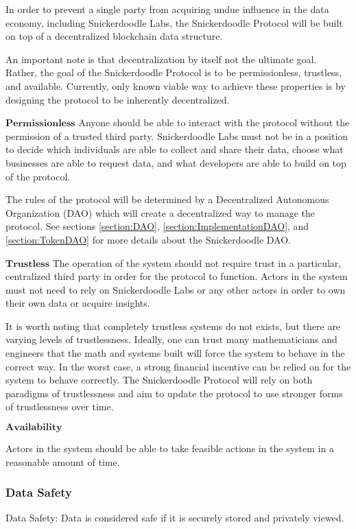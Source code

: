 In order to prevent a single party from acquiring undue influence in the data economy, including Snickerdoodle Labs, the Snickerdoodle Protocol will be built on top of a 
decentralized blockchain data structure. 

An important note is that decentralization by itself not the ultimate goal. Rather, the goal of the Snickerdoodle Protocol is to be permissionless, trustless, and available. 
Currently, only known viable way to achieve these properties is by designing the protocol to be inherently decentralized.

$\mathbf{Permissionless}$
Anyone should be able to interact with the protocol without the permission of a trusted third party. Snickerdoodle Labs must not be in a position to decide which individuals 
are able to collect and share their data, choose what businesses are able to request data, and what developers are able to build on top of the protocol. 

The rules of the protocol will be determined by a Decentralized Autonomous Organization (DAO) which will create a decentralized way to manage the protocol. 
See sections \ref{section:DAO}, \ref{section:ImplementationDAO}, and \ref{section:TokenDAO} for more details about the Snickerdoodle DAO.

$\mathbf{Trustless}$
The operation of the system should not require trust in a particular, centralized third party in order for the protocol to function.  Actors in the system must not 
need to rely on Snickerdoodle Labs or any other actors in order to own their own data or acquire insights.

It is worth noting that completely trustless systems do not exists, but there are varying levels of trustlessness. Ideally, one can trust many mathematicians 
and engineers that the math and systems built will force the system to behave in the correct way. In the worst case, a strong financial incentive can be relied on for 
the system to behave correctly. The Snickerdoodle Protocol will rely on both paradigms of trustlessness and aim to update the protocol to use stronger forms of trustlessness 
over time.

$\mathbf{Availability}$

Actors in the system should be able to take feasible actions in the system in a reasonable amount of time.

\subsubsection{Data Safety}
\begin{definition}
\label{definition:DataSafety}
Data Safety: Data is considered safe if it is securely stored and privately viewed.
\end{definition}


